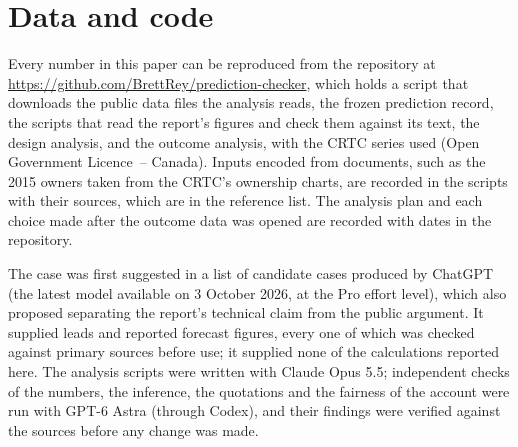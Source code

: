 \section{Data and code}

Every number in this paper can be reproduced from the repository at \url{https://github.com/BrettRey/prediction-checker}, which holds a script that downloads the public data files the analysis reads, the frozen prediction record, the scripts that read the report's figures and check them against its text, the design analysis, and the outcome analysis, with the CRTC series used (Open Government Licence~-- Canada). Inputs encoded from documents, such as the 2015 owners taken from the CRTC's ownership charts, are recorded in the scripts with their sources, which are in the reference list. The analysis plan and each choice made after the outcome data was opened are recorded with dates in the repository.

The case was first suggested in a list of candidate cases produced by ChatGPT (the latest model available on 3 October 2026, at the Pro effort level), which also proposed separating the report's technical claim from the public argument. It supplied leads and reported forecast figures, every one of which was checked against primary sources before use; it supplied none of the calculations reported here. The analysis scripts were written with Claude Opus 5.5; independent checks of the numbers, the inference, the quotations and the fairness of the account were run with GPT-6 Astra (through Codex), and their findings were verified against the sources before any change was made.
